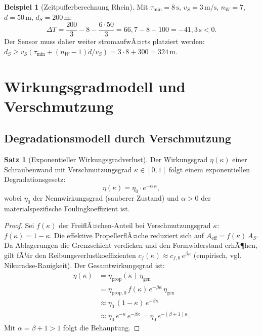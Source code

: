 ﻿\documentclass[a4paper,12pt]{article}
\theoremstyle{definition}
\newtheorem{beispiel}{Beispiel}
\newtheorem{satz}{Satz}
\begin{document}
\begin{beispiel}[Zeitpufferberechnung Rhein]
Mit $\tau_{\mathrm{min}} = 8\,\mathrm{s}$, $v_S = 3\,\mathrm{m/s}$, $n_W = 7$, $d = 50\,\mathrm{m}$,
$d_S = 200\,\mathrm{m}$:
\[
  \Delta T = \frac{200}{3} - 8 - \frac{6 \cdot 50}{3} = 66{,}7 - 8 - 100 = -41{,}3\,\mathrm{s} < 0.
\]
Der Sensor muss daher weiter stromaufwÃ¤rts platziert werden: $d_S \geq v_S(\tau_{\mathrm{min}} + (n_W-1)d/v_S) = 3 \cdot 8 + 300 = 324\,\mathrm{m}$.
\end{beispiel}

\section{Wirkungsgradmodell und Verschmutzung}

\subsection{Degradationsmodell durch Verschmutzung}

\begin{satz}[Exponentieller Wirkungsgradverlust]
\label{satz:wirkungsgrad}
Der Wirkungsgrad $\eta(\kappa)$ einer Schraubenwand mit Verschmutzungsgrad
$\kappa \in [0, 1]$ folgt einem exponentiellen Degradationsgesetz:
\[
  \eta(\kappa) = \eta_0 \cdot e^{-\alpha\,\kappa},
\]
wobei $\eta_0$ der Nennwirkungsgrad (sauberer Zustand) und $\alpha > 0$ der
materialspezifische Foulingkoeffizient ist.
\end{satz}

\begin{proof}
Sei $f(\kappa)$ der FreiflÃ¤chen-Anteil bei Verschmutzungsgrad $\kappa$:
$f(\kappa) = 1 - \kappa$. Die effektive PropellerflÃ¤che reduziert sich auf
$A_{\mathrm{eff}} = f(\kappa)\,A_S$. Da Ablagerungen die Grenzschicht verdicken
und den Formwiderstand erhÃ¶hen, gilt fÃ¼r den Reibungsverlustkoeffizienten
$c_f(\kappa) \approx c_{f,0}\,e^{\beta\kappa}$ (empirisch, vgl. Nikuradse-Rauigkeit).
Der Gesamtwirkungsgrad ist:
\begin{align*}
  \eta(\kappa) &= \eta_{\mathrm{prop}}(\kappa)\,\eta_{\mathrm{gen}} \\
               &= \eta_{\mathrm{prop},0}\,f(\kappa)\,e^{-\beta\kappa}\,\eta_{\mathrm{gen}} \\
               &\approx \eta_0\,(1-\kappa)\,e^{-\beta\kappa} \\
               &\approx \eta_0\,e^{-\kappa}\,e^{-\beta\kappa} = \eta_0\,e^{-(\beta+1)\kappa}.
\end{align*}
Mit $\alpha = \beta + 1 > 1$ folgt die Behauptung. \qedhere
\end{proof}
\end{document}
